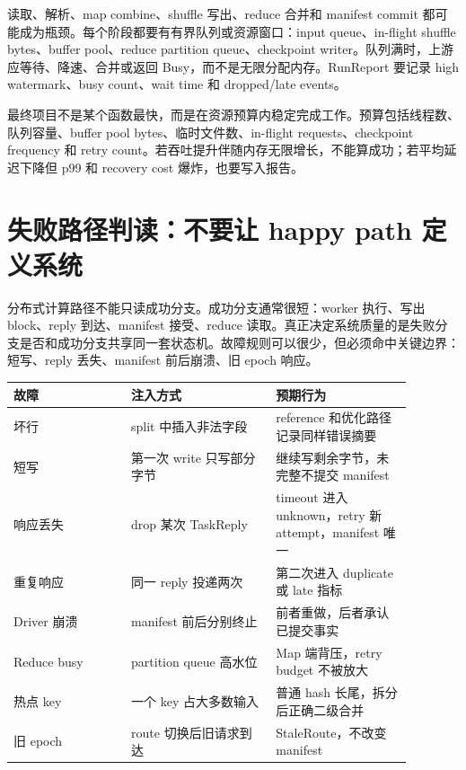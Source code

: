 读取、解析、map combine、shuffle 写出、reduce 合并和 manifest commit 都可能成为瓶颈。每个阶段都要有有界队列或资源窗口：input queue、in-flight shuffle bytes、buffer pool、reduce partition queue、checkpoint writer。队列满时，上游应等待、降速、合并或返回 Busy，而不是无限分配内存。RunReport 要记录 high watermark、busy count、wait time 和 dropped/late events。

最终项目不是某个函数最快，而是在资源预算内稳定完成工作。预算包括线程数、队列容量、buffer pool bytes、临时文件数、in-flight requests、checkpoint frequency 和 retry count。若吞吐提升伴随内存无限增长，不能算成功；若平均延迟下降但 p99 和 recovery cost 爆炸，也要写入报告。

\section{失败路径判读：不要让 happy path 定义系统}

分布式计算路径不能只读成功分支。成功分支通常很短：worker 执行、写出 block、reply 到达、manifest 接受、reduce 读取。真正决定系统质量的是失败分支是否和成功分支共享同一套状态机。故障规则可以很少，但必须命中关键边界：短写、reply 丢失、manifest 前后崩溃、旧 epoch 响应。

\begin{center}
\begin{tabular}{p{0.26\linewidth}p{0.32\linewidth}p{0.30\linewidth}}
\toprule
故障 & 注入方式 & 预期行为 \\
\midrule
坏行 & split 中插入非法字段 & reference 和优化路径记录同样错误摘要 \\
短写 & 第一次 write 只写部分字节 & 继续写剩余字节，未完整不提交 manifest \\
响应丢失 & drop 某次 TaskReply & timeout 进入 unknown，retry 新 attempt，manifest 唯一 \\
重复响应 & 同一 reply 投递两次 & 第二次进入 duplicate 或 late 指标 \\
Driver 崩溃 & manifest 前后分别终止 & 前者重做，后者承认已提交事实 \\
Reduce busy & partition queue 高水位 & Map 端背压，retry budget 不被放大 \\
热点 key & 一个 key 占大多数输入 & 普通 hash 长尾，拆分后正确二级合并 \\
旧 epoch & route 切换后旧请求到达 & StaleRoute，不改变 manifest \\
\bottomrule
\end{tabular}
\end{center}

